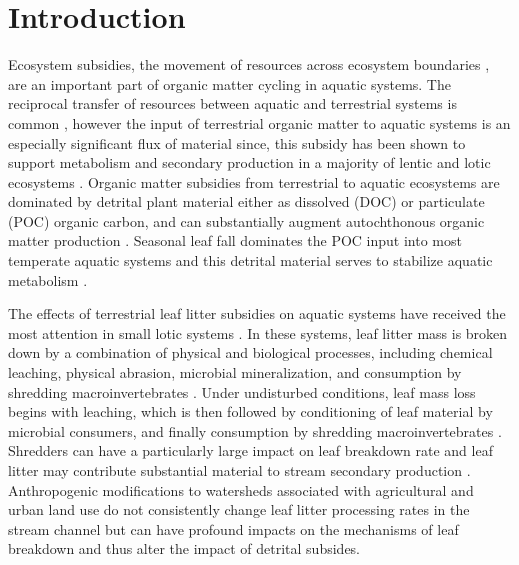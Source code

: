 \documentclass{article}
\begin{document}
\section{Introduction}
Ecosystem subsidies, the movement of resources across ecosystem boundaries \cite{Polis_1997}, are an important part of organic matter cycling in aquatic systems. The reciprocal transfer of resources between aquatic and terrestrial systems is common \cite{Nakano_2001, BAXTER_2005} , however the input of terrestrial organic matter to aquatic systems is an especially significant flux of material since, this subsidy has been shown to support metabolism and secondary production in a majority of lentic and lotic ecosystems \cite{Marcarelli_2011}. Organic matter subsidies from terrestrial to aquatic ecosystems are dominated by detrital plant material either as dissolved (DOC) or particulate (POC) organic carbon, and can substantially augment autochthonous organic matter production \cite{Hodkinson_1975,Gasith_1976,Wetzel_1984,WETZEL_1995,Webster_1997,Kobayashi_2011,Mehring_2014}. Seasonal leaf fall dominates the POC input into most temperate aquatic systems \cite{Wallace_1999} and this detrital material serves to stabilize aquatic metabolism \cite{Wetzel_1984}.

The effects of terrestrial leaf litter subsidies on aquatic systems have received the most attention in small lotic systems \cite{Webster_1986}.  In these systems, leaf litter mass is broken down by a combination of physical and biological processes, including chemical leaching, physical abrasion, microbial mineralization, and consumption by shredding macroinvertebrates \cite{Gessner_1999}. Under undisturbed conditions, leaf mass loss begins with leaching, which is then followed by conditioning of leaf material by microbial consumers, and finally consumption by shredding macroinvertebrates \cite{Cummins_1974}. Shredders can have a particularly large impact on leaf breakdown rate and leaf litter may contribute substantial material to stream secondary production \cite{Wallace_1997,Gra_a_2001,Eggert_2003, Creed_2009}. Anthropogenic modifications to watersheds associated with agricultural and urban land use do not consistently change leaf litter processing rates in the stream channel \cite{Bird_1992,HURYN_2002,Walsh_2005,Hagen_2006} but can have profound impacts on the mechanisms of leaf breakdown \cite{Bird_1992,PAUL_2006,Imberger_2008} and thus alter the impact of detrital subsides.   
\end{document}
